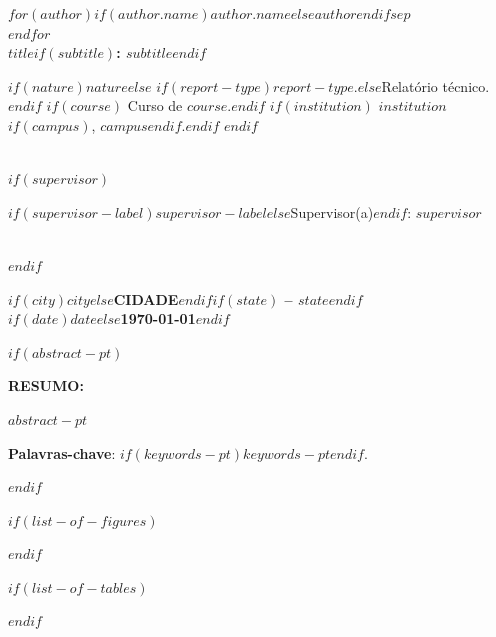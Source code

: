 \documentclass[
  12pt,
  oneside,
  a4paper,
  chapter=TITLE,
  english,
  portuguese
]{abntex2}
\renewcommand{\ABNTEXchapterfont}{\bfseries}
\begin{document}
\begin{folhaderosto}
  \center

  {\ABNTEXchapterfont\bfseries\large
    $for(author)$$if(author.name)$\MakeUppercase{$author.name$}$else$\MakeUppercase{$author$}$endif$$sep$\\$endfor$
  }\\[15\baselineskip]

  {\ABNTEXchapterfont\bfseries\large
    \MakeUppercase{$title$}$if(subtitle)$: $subtitle$$endif$
  }\\[2cm]

  \hspace*{8cm}
  \parbox{8cm}{\normalsize\setlength{\parskip}{0pt}\setlength{\parindent}{0pt}\normalfont
    $if(nature)$$nature$$else$%
      $if(report-type)$$report-type$.$else$Relatório técnico.$endif$
      $if(course)$ Curso de $course$.$endif$
      $if(institution)$ $institution$$if(campus)$, $campus$$endif$.$endif$
    $endif$
  }\\[0.8cm]

  $if(supervisor)$
  \hspace*{8cm}
  \parbox{8cm}{\normalsize\normalfont
    $if(supervisor-label)$$supervisor-label$$else$Supervisor(a)$endif$: $supervisor$
  }\\[0.5cm]
  $endif$

  \vfill

  {\ABNTEXchapterfont\large
    \MakeUppercase{$if(city)$$city$$else$CIDADE$endif$}$if(state)$ -- $state$$endif$\\
    $if(date)$$date$$else$\today$endif$
  }
\end{folhaderosto}

$if(abstract-pt)$
\newpage
\thispagestyle{empty}
\begin{resumoumacoluna}
\noindent\textbf{RESUMO:}\vspace{\onelineskip}

$abstract-pt$

\vspace{\onelineskip}
\noindent\textbf{Palavras-chave}: $if(keywords-pt)$$keywords-pt$$endif$.
\end{resumoumacoluna}
\clearpage
$endif$

$if(list-of-figures)$
\listoffigures*
\cleardoublepage
$endif$

$if(list-of-tables)$
\listoftables*
\cleardoublepage
$endif$
\end{document}
